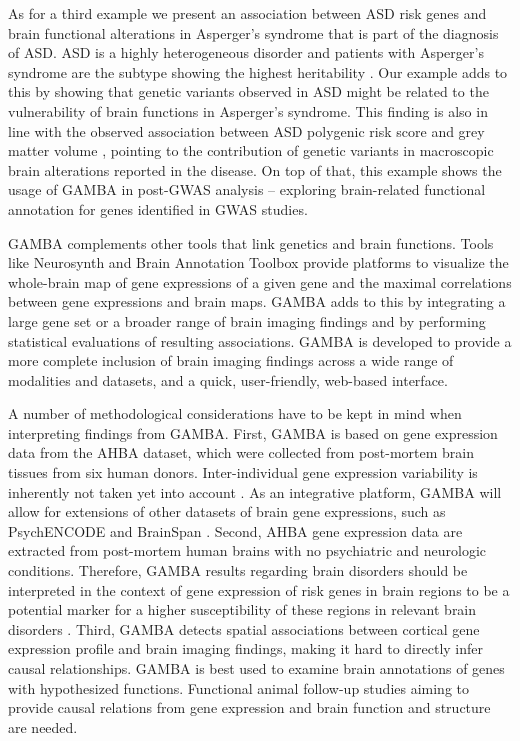 \begin{refsection}
As for a third example we present an association between ASD risk genes and brain functional alterations in Asperger's syndrome that is part of the diagnosis of ASD. ASD is a highly heterogeneous disorder and patients with Asperger's syndrome are the subtype showing the highest heritability \citep{Grove2019IdentificationOC}. Our example adds to this by showing that genetic variants observed in ASD might be related to the vulnerability of brain functions in Asperger's syndrome. This finding is also in line with the observed association between ASD polygenic risk score and grey matter volume \citep{Ranlund2018AssociationsBP}, pointing to the contribution of genetic variants in macroscopic brain alterations reported in the disease. On top of that, this example shows the usage of GAMBA in post-GWAS analysis -- exploring brain-related functional annotation for genes identified in GWAS studies. 

GAMBA complements other tools that link genetics and brain functions. Tools like Neurosynth \citep{Yarkoni2011LargescaleAS} and Brain Annotation Toolbox \citep{Liu2019BrainAT} provide platforms to visualize the whole-brain map of gene expressions of a given gene and the maximal correlations between gene expressions and brain maps. GAMBA adds to this by integrating a large gene set or a broader range of brain imaging findings and by performing statistical evaluations of resulting associations. GAMBA is developed to provide a more complete inclusion of brain imaging findings across a wide range of modalities and datasets, and a quick, user-friendly, web-based interface. 

A number of methodological considerations have to be kept in mind when interpreting findings from GAMBA. First, GAMBA is based on gene expression data from the AHBA dataset, which were collected from post-mortem brain tissues from six human donors. Inter-individual gene expression variability is inherently not taken yet into account \citep{Miller2014TranscriptionalLO,Tebbenkamp2014TheDT}. As an integrative platform, GAMBA will allow for extensions of other datasets of brain gene expressions, such as PsychENCODE \citep{wang2018comprehensive} and BrainSpan \citep{johnson2009functional}. Second, AHBA gene expression data are extracted from post-mortem human brains with no psychiatric and neurologic conditions. Therefore, GAMBA results regarding brain disorders should be interpreted in the context of gene expression of risk genes in brain regions to be a potential marker for a higher susceptibility of these regions in relevant brain disorders \citep{McColgan2018BrainRS,Romme2017ConnectomeDA}. Third, GAMBA detects spatial associations between cortical gene expression profile and brain imaging findings, making it hard to directly infer causal relationships. GAMBA is best used to examine brain annotations of genes with hypothesized functions. Functional animal follow-up studies aiming to provide causal relations from gene expression and brain function and structure are needed. 


\end{refsection}

